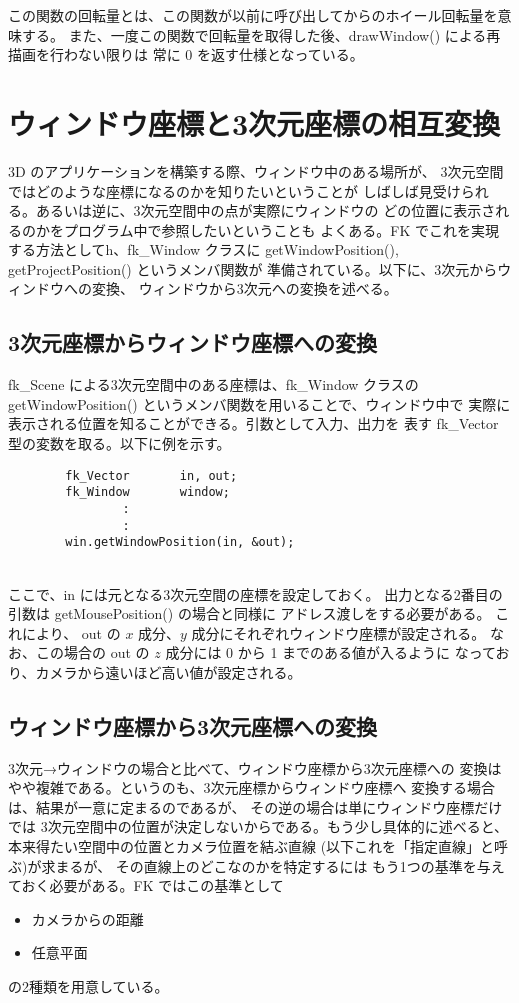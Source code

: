 この関数の回転量とは、この関数が以前に呼び出してからのホイール回転量を意味する。
また、一度この関数で回転量を取得した後、drawWindow() による再描画を行わない限りは
常に 0 を返す仕様となっている。

\section{ウィンドウ座標と3次元座標の相互変換}
3D のアプリケーションを構築する際、ウィンドウ中のある場所が、
3次元空間ではどのような座標になるのかを知りたいということが
しばしば見受けられる。あるいは逆に、3次元空間中の点が実際にウィンドウの
どの位置に表示されるのかをプログラム中で参照したいということも
よくある。FK でこれを実現する方法としてh、fk\_Window クラスに
getWindowPosition(), getProjectPosition() というメンバ関数が
準備されている。以下に、3次元からウィンドウへの変換、
ウィンドウから3次元への変換を述べる。

\subsection{3次元座標からウィンドウ座標への変換}
fk\_Scene による3次元空間中のある座標は、fk\_Window クラスの
getWindowPosition() というメンバ関数を用いることで、ウィンドウ中で
実際に表示される位置を知ることができる。引数として入力、出力を
表す fk\_Vector 型の変数を取る。以下に例を示す。
\\
\begin{breakbox}
\begin{verbatim}
        fk_Vector       in, out;
        fk_Window       window;
                :
                :
        win.getWindowPosition(in, &out);
\end{verbatim}
\end{breakbox}
~ \\
ここで、in には元となる3次元空間の座標を設定しておく。
出力となる2番目の引数は getMousePosition() の場合と同様に
アドレス渡しをする必要がある。
これにより、
out の \(x\) 成分、\(y\) 成分にそれぞれウィンドウ座標が設定される。
なお、この場合の out の \(z\) 成分には 0 から 1 までのある値が入るように
なっており、カメラから遠いほど高い値が設定される。

\subsection{ウィンドウ座標から3次元座標への変換}
3次元→ウィンドウの場合と比べて、ウィンドウ座標から3次元座標への
変換はやや複雑である。というのも、3次元座標からウィンドウ座標へ
変換する場合は、結果が一意に定まるのであるが、
その逆の場合は単にウィンドウ座標だけでは
3次元空間中の位置が決定しないからである。もう少し具体的に述べると、
本来得たい空間中の位置とカメラ位置を結ぶ直線
(以下これを「指定直線」と呼ぶ)が求まるが、
その直線上のどこなのかを特定するには
もう1つの基準を与えておく必要がある。FK ではこの基準として
\begin{itemize}
 \item カメラからの距離
 \item 任意平面
\end{itemize}
の2種類を用意している。

